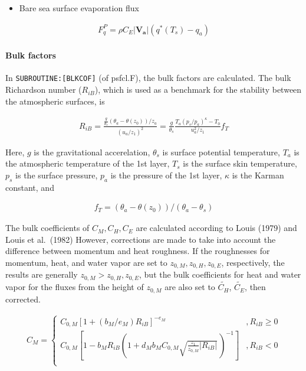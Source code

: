 \begin{itemize}
\tightlist
\item
  Bare sea surface evaporation flux
\end{itemize}

\begin{eqnarray}
    F_q^P = \rho C_E |\mathbf{V_a}| \left( q^{\ast}(T_s) - q_a \right)
\end{eqnarray}

\hypertarget{bulk-factors}{%
\paragraph{Bulk factors}\label{bulk-factors}}

In \texttt{SUBROUTINE:{[}BLKCOF{]}} (of psfcl.F), the bulk factors are calculated. The bulk Richardson number (\(R_{iB}\)), which is used as a benchmark for the stability between the atmospheric
surfaces, is

\begin{eqnarray}
R_{iB} =
            \frac{ \frac{g}{\theta_s} (\theta_a - \theta(z_0))/z_a }
              { (u_a/z_1)^2                                  }
       = \frac{g}{\theta_s}
         \frac{T_a (p_s/p_a)^\kappa - T_0 }{u_a^2/z_1} f_T
\end{eqnarray}

Here, \(g\) is the gravitational accerelation, \(\theta_s\) is surface potential temperature, \(T_a\) is the atmospheric temperature of the 1st layer, \(T_s\) is the surface skin temperature, \(p_s\)
is the surface pressure, \(p_a\) is the pressure of the 1st layer, \(\kappa\) is the Karman constant, and

\begin{eqnarray}
f_T = (\theta_a - \theta(z_0))/(\theta_a - \theta_s)
\end{eqnarray}

The bulk coefficients of \(C_M,C_H,C_E\) are calculated according to Louis (1979) and Louis et al.~(1982) However, corrections are made to take into account the difference between momentum and heat
roughness. If the roughnesses for momentum, heat, and water vapor are set to \(z_{0,M}, z_{0,H}, z_{0,E}\), respectively, the results are generally \(z_{0,M} > z_{0,H}, z_{0,E}\), but the bulk
coefficients for heat and water vapor for the fluxes from the height of \(z_{0,M}\) are also set to \(\widetilde{C_H}\), \(\widetilde{C_E}\), then corrected.

\begin{eqnarray}
    C_M = \left\{
      \begin{array}{lr}
      C_{0,M} [ 1 + (b_M/e_M)  R_{iB} ]^{-e_M}
            &,
          R_{iB} \geq 0 \\
      C_{0,M} \left[ 1 - b_M R_{iB} \left( 1+ d_M b_M C_{0,M}
                                  \sqrt{\frac{z_1}{z_{0,M}}| R_{iB}|} \,
                                  \right)^{-1} \right]     
          &,
          R_{iB} < 0 \\
      \end{array} \right.
\end{eqnarray}


